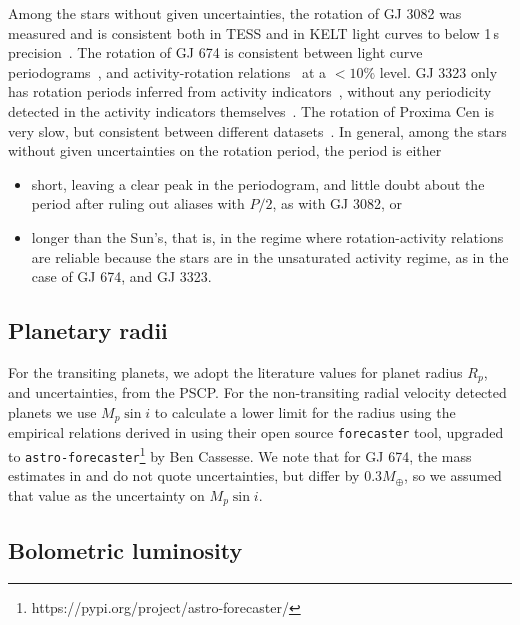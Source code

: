 \documentclass[twocolumn]{aastex631}
\begin{document}
Among the stars without given uncertainties, the rotation of GJ 3082 was measured and is consistent both in TESS and in KELT light curves to below 1\,s precision~\citep{gunther2020stellar}. The rotation of GJ 674 is consistent between light curve periodograms~\citep{kiraga2007agerotationactivity}, and activity-rotation relations~\citep{boisse2011disentangling} at a $<10\%$ level. GJ 3323 only has rotation periods inferred from activity indicators~\citep{astudillo-defru2017magnetic}, without any periodicity detected in the activity indicators themselves~\citep{astudillo-defru2017harps}. The rotation of Proxima Cen is very slow, but consistent between different datasets~\citep{anglada-escude2016terrestrial, kiraga2007agerotationactivity}. In general, among the stars without given uncertainties on the rotation period, the period is either 
\begin{itemize}
    \item short, leaving a clear peak in the periodogram, and little doubt about the period after ruling out aliases with $P/2$, as with GJ 3082, or
    \item longer than the Sun's, that is, in the regime where rotation-activity relations are reliable because the stars are in the unsaturated activity regime, as in the case of GJ 674, and GJ 3323.
\end{itemize} 


\subsection{Planetary radii}
\label{sec:data:planetradii}
For the transiting planets, we adopt the literature values for planet radius $R_p$, and uncertainties, from the PSCP. For the non-transiting radial velocity detected planets we use  $M_p\sin i$ to calculate a lower limit for the radius using the empirical relations derived in \cite{chen2017probabilistic} using their open source \texttt{forecaster} tool, upgraded to \texttt{astro-forecaster}\footnote{https://pypi.org/project/astro-forecaster/} by Ben Cassesse. We note that for GJ 674, the mass estimates in \cite{bonfils2007harps} and \cite{boisse2011disentangling} do not quote uncertainties, but differ by $0.3M_\oplus$, so we assumed that value as the uncertainty on $M_p\sin i$.

\subsection{Bolometric luminosity}
\label{sec:data:lum}
\end{document}
